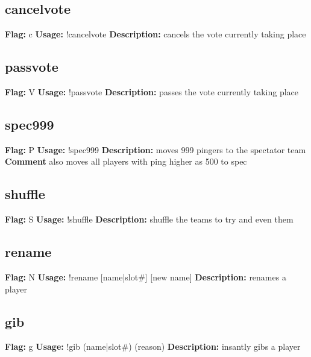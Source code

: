 \subsection{cancelvote}
\textbf{Flag:} \hfill c \linebreak\textbf{Usage:} \hfill !cancelvote  \linebreak
\textbf{Description:} \hfill cancels the vote currently taking place

\subsection{passvote}
\textbf{Flag:} \hfill V \linebreak\textbf{Usage:} \hfill !passvote  \linebreak
\textbf{Description:} \hfill passes the vote currently taking place

\subsection{spec999}
\textbf{Flag:} \hfill P \linebreak\textbf{Usage:} \hfill !spec999  \linebreak
\textbf{Description:} \hfill moves 999 pingers to the spectator team
\linebreak
\textbf{Comment} \hfill also moves all players with ping higher as 500 to spec

\subsection{shuffle}
\textbf{Flag:} \hfill S \linebreak\textbf{Usage:} \hfill !shuffle  \linebreak
\textbf{Description:} \hfill shuffle the teams to try and even them

\subsection{rename}
\textbf{Flag:} \hfill N \linebreak\textbf{Usage:} \hfill !rename [name|slot\#] [new name] \linebreak
\textbf{Description:} \hfill renames a player

\subsection{gib}
\textbf{Flag:} \hfill g \linebreak\textbf{Usage:} \hfill !gib (name|slot\#) (reason) \linebreak
\textbf{Description:} \hfill insantly gibs a player

